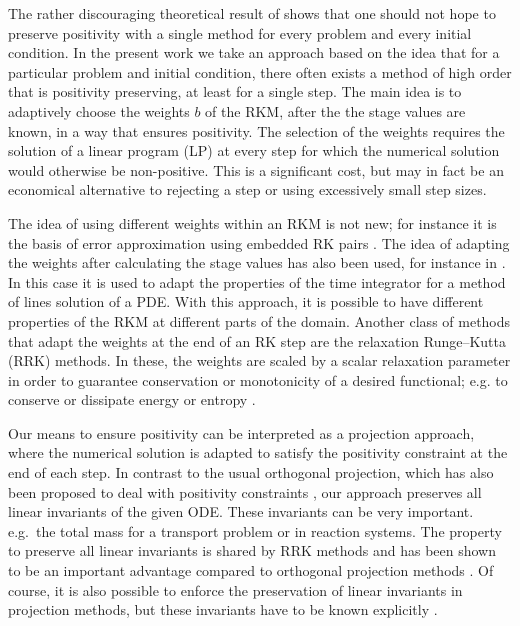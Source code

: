 \documentclass[a4paper]{article}
\numberwithin{equation}{section}
\theoremstyle{plain}
\theoremstyle{definition}
\numberwithin{theorem}{section}
\newcommand{\1}{\mathbbm{1}}
\begin{document}
The rather discouraging theoretical result of \cite{bolley_conservation_1978} shows that one
should not hope to preserve positivity with a single method for every problem and every
initial condition.  In the present work we take an approach based on the idea that for
a particular problem and initial condition, there often exists a method of high order
that is positivity preserving, at least for a single step.
The main idea is to adaptively choose the weights $b$ of the RKM, after the
the stage values are known, in a way that ensures positivity.  
The selection of the weights requires the solution of a linear program (LP) at every
step for which the numerical solution would otherwise be non-positive.
This is a significant cost, but may in fact be an economical alternative to rejecting
a step or using excessively small step sizes.

The idea of using different weights within an RKM is not new; for instance it is
the basis of error approximation using embedded RK pairs \cite{hairer_solving_1993}.
The idea of adapting the weights after calculating the stage values has also been used,
for instance in \cite{ketcheson_spatially_2013}.
In this case it is used to adapt the properties of the time integrator for a method of lines solution of a PDE. With this approach, it is possible to have different properties of the RKM at different parts of the domain. 
Another class of methods that adapt the weights at the end of an RK step
are the relaxation Runge–Kutta (RRK) methods. 
In these, the weights are scaled by a scalar relaxation parameter in order to guarantee
conservation or monotonicity of a desired functional; e.g. to conserve or
dissipate energy or entropy
\cite{ketcheson_relaxation_2019,ranocha_relaxation_2019,ranocha2020general}.

Our means to ensure positivity can be interpreted as a projection
approach, where the numerical solution is adapted to satisfy the
positivity constraint at the end of each step. In contrast to the
usual orthogonal projection, which has also been proposed to deal
with positivity constraints \cite{shampine1986conservation},
our approach preserves all linear invariants of the given ODE. These
invariants can be very important. e.g.\ the total mass for a transport
problem or in reaction systems. The property to preserve all linear
invariants is shared by RRK methods and has been shown to be an
important advantage compared to orthogonal projection methods
\cite{ranocha2020relaxationHamiltonian}. Of course, it is also
possible to enforce the preservation of linear invariants in projection
methods, but these invariants have to be known explicitly
\cite{sandu2001positive}.
\end{document}
